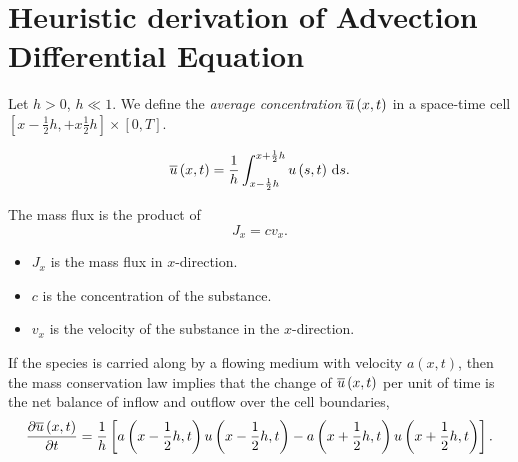 \section{Heuristic derivation of Advection Differential Equation}

\begin{frame}
	\begin{definition}
		Let $h>0$, $h\ll 1$.
		We define the \emph{average concentration}
		\begin{math}
			\overline{u}\left(x,t\right)
		\end{math}
		in a space-time cell
		\begin{math}
			\left[
				x-\frac{1}{2}h,
				+x\frac{1}{2}h
				\right]
			\times
			\left[
				0,T
				\right]
		\end{math}.

		\begin{equation*}
			\averageconcentration=
			\dfrac{1}{h}
			\int_{x-\frac{1}{2}h}^{x+\frac{1}{2}h}
			u
			\left(
			s,t
			\right)
			\dl s.
		\end{equation*}
	\end{definition}

	\begin{definition}
		The mass flux is the product of
		\begin{equation*}
			J_{x}=
			c
			v_{x}.
		\end{equation*}

		\begin{itemize}
			\item

			      $J_{x}$ is the mass flux in $x$-direction.

			\item

			      $c$ is the concentration of the substance.

			\item

			      $v_{x}$ is the velocity of the substance in the
			      $x$-direction.
		\end{itemize}
	\end{definition}

	\begin{theorem}
		If the species is carried along by a flowing medium with
		velocity
		\begin{math}
			a\left(x,t\right)
		\end{math},
		then the mass conservation law
		implies that the change of
		\begin{math}
			\overline{u}\left(x,t\right)
		\end{math}
		per
		unit of time is the net balance of inflow and outflow over
		the cell boundaries,
		\begin{equation*}
			\diffp{\averageconcentration}{t}=
			\dfrac{1}{h}
			\left[
				a
				\left(
				x-\frac{1}{2}h,t
				\right)
				u
				\left(
				x-\frac{1}{2}h,t
				\right)-
				a
				\left(
				x+\frac{1}{2}h,t
				\right)
				u
				\left(
				x+\frac{1}{2}h,t
				\right)
				\right].
		\end{equation*}
	\end{theorem}
\end{frame}


